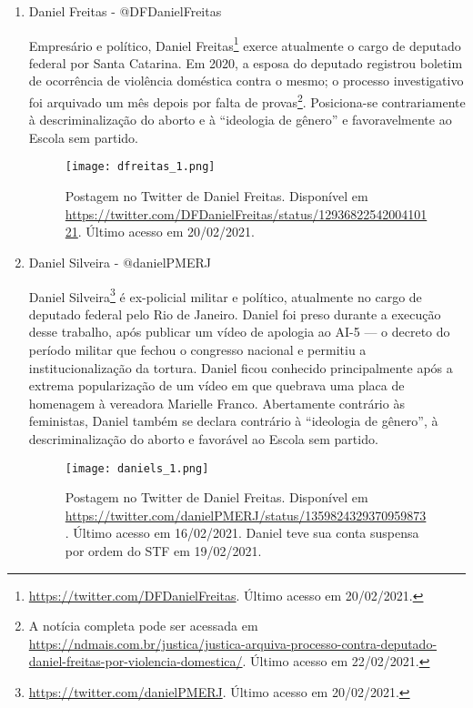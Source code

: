 \documentclass[
	12pt,				%
	openright,			%
	twoside,			%
	a4paper,			%
	english,			%
	brazil				%
	]{abntex2}
\begin{document}
\begin{anexosenv}
\begin{enumerate}
 \item Daniel Freitas - @DFDanielFreitas
 
 Empresário e político, Daniel Freitas\footnote{\url{https://twitter.com/DFDanielFreitas}. Último acesso em 20/02/2021.} exerce atualmente o cargo de deputado federal por Santa Catarina. Em 2020, a esposa do deputado registrou boletim de ocorrência de violência doméstica contra o mesmo; o processo investigativo foi arquivado um mês depois por falta de provas\footnote{A notícia completa pode ser acessada em  \url{https://ndmais.com.br/justica/justica-arquiva-processo-contra-deputado-daniel-freitas-por-violencia-domestica/}. Último acesso em 22/02/2021.}. Posiciona-se contrariamente à descriminalização do aborto e à ``ideologia de gênero'' e favoravelmente ao Escola sem partido.
 
 \begin{figure}[!htbp]
    \centering
    \texttt{[image: dfreitas\_1.png]}
    \caption{Postagem no Twitter de Daniel Freitas. Disponível em \url{https://twitter.com/DFDanielFreitas/status/1293682254200410121}. Último acesso em 20/02/2021.}
 \end{figure}
 
  
 \item Daniel Silveira - @danielPMERJ
 
 Daniel Silveira\footnote{\url{https://twitter.com/danielPMERJ}. Último acesso em 20/02/2021.} é ex-policial militar e político, atualmente no cargo de deputado federal pelo Rio de Janeiro. Daniel foi preso durante a execução desse trabalho, após publicar um vídeo de apologia ao AI-5 --- o decreto do período militar que fechou o congresso nacional e permitiu a institucionalização da tortura. Daniel ficou conhecido principalmente após a extrema popularização de um vídeo em que quebrava uma placa de homenagem à vereadora Marielle Franco. Abertamente contrário às feministas, Daniel também se declara contrário à ``ideologia de gênero'', à descriminalização do aborto e favorável ao Escola sem partido.
 
 \begin{figure}[!htbp]
    \centering
    \texttt{[image: daniels\_1.png]}
    \caption{Postagem no Twitter de Daniel Freitas. Disponível em \url{https://twitter.com/danielPMERJ/status/1359824329370959873}. Último acesso em 16/02/2021. Daniel teve sua conta suspensa por ordem do STF em 19/02/2021.}
 \end{figure}
 

\end{enumerate}
\end{anexosenv}
\end{document}
